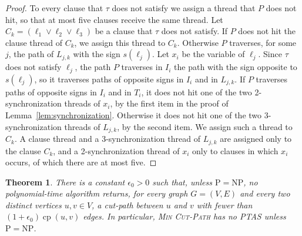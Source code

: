 \documentclass[a4paper,fleqn]{cas-sc}
\numberwithin{equation}{section}
\theoremstyle{definition}
\theoremstyle{plain}
\newtheorem{theorem}[definition]{Theorem}
\theoremstyle{remark}
\newcommand{\cp}{\operatorname{cp}}                  %
\newcommand{\MinCutPath}{\textsc{Min Cut-Path}}
\begin{document}
\begin{proof}
To every clause that $\tau$ does not satisfy we assign a thread that $P$ does not hit, so that at most five clauses receive the same thread.
Let $C_k = (\ell_1 \vee \ell_2 \vee \ell_3)$ be a clause that $\tau$ does not satisfy.
If $P$ does not hit the clause thread of $C_k$, we assign this thread to $C_k$.
Otherwise $P$ traverses, for some $j$, the path of $L_{j,k}$ with the sign $s(\ell_j)$.
Let $x_i$ be the variable of $\ell_j$.
Since $\tau$ does not satisfy $\ell_j$, the path $P$ traverses in $I_i$ the path with the sign opposite to $s(\ell_j)$, so it traverses paths of opposite signs in $I_i$ and in $L_{j,k}$.
If $P$ traverses paths of opposite signs in $I_i$ and in $T_i$, it does not hit one of the two 2-synchronization threads of $x_i$, by the first item in the proof of Lemma~\ref{lem:synchronization}.
Otherwise it does not hit one of the two 3-synchronization threads of $L_{j,k}$, by the second item.
We assign such a thread to $C_k$.
A clause thread and a 3-synchronization thread of $L_{j,k}$ are assigned only to the clause $C_k$, and a 2-synchronization thread of $x_i$ only to clauses in which $x_i$ occurs, of which there are at most five.
\end{proof}

\begin{theorem}
\label{thm:no-ptas}
There is a constant $\epsilon_0 > 0$ such that, unless $\mathrm{P} = \mathrm{NP}$, no polynomial-time algorithm returns, for every graph $G = (V, E)$ and every two distinct vertices $u, v \in V$, a cut-path between $u$ and $v$ with fewer than $(1+\epsilon_0)\cp(u,v)$ edges.
In particular, \MinCutPath{} has no PTAS unless $\mathrm{P} = \mathrm{NP}$.
\end{theorem}
\end{document}
